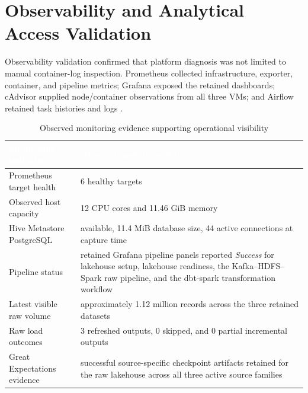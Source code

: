\section{Observability and Analytical Access Validation}
Observability validation confirmed that platform diagnosis was not limited to manual container-log inspection. Prometheus collected infrastructure, exporter, container, and pipeline metrics; Grafana exposed the retained dashboards; cAdvisor supplied node/container observations from all three VMs; and Airflow retained task histories and logs \cite{prometheus_docs,grafana_docs,apache_airflow_docs}.

\begin{table}[!htbp]
    \centering
    \footnotesize
    \renewcommand{\arraystretch}{1.14}
    \begin{tabularx}{\textwidth}{|L{0.39\textwidth}|Y|}
        \hline
        \textcolor{white}{\textbf{Monitoring indicator}} & \textcolor{white}{\textbf{Observed metric or state}} \\
        \hline
        Prometheus target health & 6 healthy targets \\
        \hline
        Observed host capacity & 12 CPU cores and 11.46 GiB memory \\
        \hline
        Hive Metastore PostgreSQL & available, 11.4 MiB database size, 44 active connections at capture time \\
        \hline
        Pipeline status & retained Grafana pipeline panels reported \textit{Success} for lakehouse setup, lakehouse readiness, the Kafka--HDFS--Spark raw pipeline, and the dbt-spark transformation workflow \\
        \hline
        Latest visible raw volume & approximately 1.12 million records across the three retained datasets \\
        \hline
        Raw load outcomes & 3 refreshed outputs, 0 skipped, and 0 partial incremental outputs \\
        \hline
        Great Expectations evidence & successful source-specific checkpoint artifacts retained for the raw lakehouse across all three active source families \\
        \hline
    \end{tabularx}
    \caption{Observed monitoring evidence supporting operational visibility}
    \label{tab:chapter8-monitoring-evidence}
\end{table}

